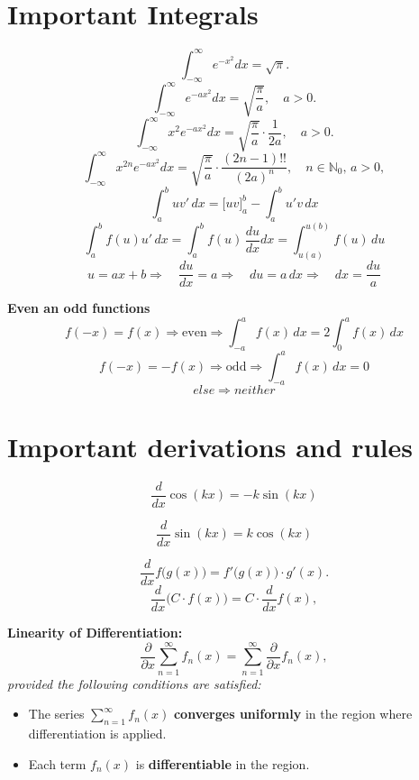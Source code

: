 \documentclass[a4paper,11pt]{article}
\renewcommand{\textbf}[1]{{\scriptsize	\bfseries #1}}
\begin{document}
\begin{footnotesize}
\begin{multicols}{2}
\begin{minipage}{\linewidth}
\section*{Important Integrals}
\[
    \int_{-\infty}^\infty e^{-x^2} dx = \sqrt{\pi}.
    \]
\[
\int_{-\infty}^\infty e^{-a x^2} dx = \sqrt{\frac{\pi}{a}}, \quad a > 0.
\]
\[
\int_{-\infty}^\infty x^2 e^{-a x^2} dx = \sqrt{\frac{\pi}{a}} \cdot \frac{1}{2a}, \quad a > 0.
\]
\[
    \int_{-\infty}^\infty x^{2n} e^{-a x^2} dx = \sqrt{\frac{\pi}{a}} \cdot \frac{(2n-1)!!}{(2a)^n}, \quad n \in \mathbb{N}_0, \, a > 0,
    \]
\[
\int_a^b u v' \, dx = \big[ u v \big]_a^b - \int_a^b u' v \, dx
\]
\[
\int_a^b f(u) u' \, dx =\int_a^b f(u) \, \frac{du}{dx} dx = \int_{u(a)}^{u(b)} f(u) \, du
\]
\[
u = ax + b \Rightarrow \quad \frac{du}{dx} = a \Rightarrow \quad du = a \, dx \Rightarrow \quad dx = \frac{du}{a} 
\]

\textbf{Even an odd functions} \\[-0.2cm]
\[
f(-x) = f(x) \Rightarrow \text{even} \Rightarrow \int_{-a}^a f(x) \, dx = 2 \int_0^a f(x) \, dx
\]
\[
f(-x) = -f(x) \Rightarrow \text{odd} \Rightarrow \int_{-a}^a f(x) \, dx = 0
\]
\[
else \Rightarrow neither
\]
\end{minipage}
\section*{Important derivations and rules}
\[
\frac{d}{dx} \cos(kx) = -k \sin(kx)
\]

\[
\frac{d}{dx} \sin(kx) = k \cos(kx)
\]

\[
\frac{d}{dx} f\big(g(x)\big) = f'\big(g(x)\big) \cdot g'(x).
\]
\[
\frac{d}{dx}\big(C \cdot f(x)\big) = C \cdot \frac{d}{dx}f(x),
\]
\begin{minipage}{\linewidth}
\textbf{Linearity of Differentiation:}  
\[
\frac{\partial}{\partial x} \sum_{n=1}^\infty f_n(x) = \sum_{n=1}^\infty \frac{\partial}{\partial x} f_n(x),
\]
\textit{provided the following conditions are satisfied:}
\begin{itemize}
    \item The series \(\sum_{n=1}^\infty f_n(x)\) \textbf{converges uniformly} in the region where differentiation is applied.
    \item Each term \(f_n(x)\) is \textbf{differentiable} in the region.
\end{itemize}
\end{minipage}


\begin{minipage}{\linewidth}


\end{minipage}
\end{multicols}
\end{footnotesize}
\end{document}
